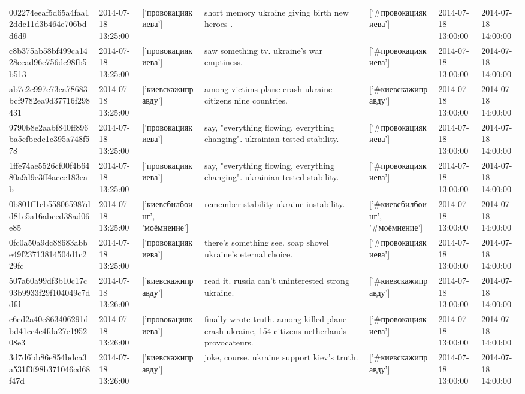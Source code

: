 \begin{tabular}{lllllll}
002274eeaf5d65a4faa12ddc11d3b464e706bdd6d9 & 2014-07-18 13:25:00 & ['провокациякиева'] & short memory ukraine giving birth new heroes . & ['#провокациякиева'] & 2014-07-18 13:00:00 & 2014-07-18 14:00:00 \\
c8b375ab58bf499ca1428eead96e756dc98fb5b513 & 2014-07-18 13:25:00 & ['провокациякиева'] & saw something tv. ukraine's war emptiness. & ['#провокациякиева'] & 2014-07-18 13:00:00 & 2014-07-18 14:00:00 \\
ab7e2c997e73ca78683bcf9782ea9d37716f298431 & 2014-07-18 13:25:00 & ['киевскажиправду'] & among victims plane crash ukraine citizens nine countries. & ['#киевскажиправду'] & 2014-07-18 13:00:00 & 2014-07-18 14:00:00 \\
9790b8e2aabf840ff896ba5cfbcde1c395a748f578 & 2014-07-18 13:25:00 & ['провокациякиева'] & say, "everything flowing, everything changing". ukrainian tested stability. & ['#провокациякиева'] & 2014-07-18 13:00:00 & 2014-07-18 14:00:00 \\
1ffe74ae5526cf00f4b6480a9d9e3ff4acce183eab & 2014-07-18 13:25:00 & ['провокациякиева'] & say, "everything flowing, everything changing". ukrainian tested stability. & ['#провокациякиева'] & 2014-07-18 13:00:00 & 2014-07-18 14:00:00 \\
0b801ff1cb558065987dd81c5a16abced38ad06e85 & 2014-07-18 13:25:00 & ['киевсбилбоинг', 'моёмнение'] & remember stability ukraine instability. & ['#киевсбилбоинг', '#моёмнение'] & 2014-07-18 13:00:00 & 2014-07-18 14:00:00 \\
0fc0a50a9dc88683abbe49f23713814504d1c229fc & 2014-07-18 13:25:00 & ['провокациякиева'] & there's something see. soap shovel ukraine's eternal choice. & ['#провокациякиева'] & 2014-07-18 13:00:00 & 2014-07-18 14:00:00 \\
507a60a99df3b10c17c93b9933f29f104049c7ddfd & 2014-07-18 13:26:00 & ['киевскажиправду'] & read it. russia can't uninterested strong ukraine. & ['#киевскажиправду'] & 2014-07-18 13:00:00 & 2014-07-18 14:00:00 \\
c6ed2a40e863406291dbd41cc4e4fda27e195208e3 & 2014-07-18 13:26:00 & ['провокациякиева'] & finally wrote truth. among killed plane crash ukraine, 154 citizens netherlands provocateurs. & ['#провокациякиева'] & 2014-07-18 13:00:00 & 2014-07-18 14:00:00 \\
3d7d6bb86e854bdca3a531f3f98b371046cd68f47d & 2014-07-18 13:26:00 & ['киевскажиправду'] & joke, course. ukraine support kiev's truth. & ['#киевскажиправду'] & 2014-07-18 13:00:00 & 2014-07-18 14:00:00 \\

\end{tabular}
